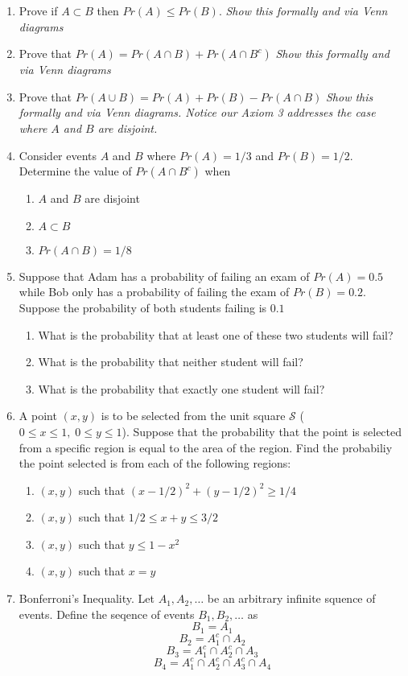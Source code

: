\documentclass[]{book}
\providecommand{\tightlist}{%
  \setlength{\itemsep}{0pt}\setlength{\parskip}{0pt}}
\begin{document}
\begin{enumerate}
\def\labelenumi{\arabic{enumi}.}
\setcounter{enumi}{4}
\item
  Prove if \(A \subset B\) then \(Pr(A) \le Pr(B)\). \emph{Show this
  formally and via Venn diagrams}
\item
  Prove that \(Pr(A) = Pr(A \cap B) + Pr( A \cap B^c)\) \emph{Show this
  formally and via Venn diagrams}
\item
  Prove that \(Pr( A \cup B) = Pr(A) + Pr(B) - Pr( A \cap B)\)
  \emph{Show this formally and via Venn diagrams. Notice our Axiom 3
  addresses the case where \(A\) and \(B\) are disjoint.}
\item
  Consider events \(A\) and \(B\) where \(Pr(A)=1/3\) and
  \(Pr(B) = 1/2\). Determine the value of \(Pr(A \cap B^c)\) when

  \begin{enumerate}
  \def\labelenumii{\alph{enumii})}
  \tightlist
  \item
    \(A\) and \(B\) are disjoint
  \item
    \(A \subset B\)
  \item
    \(Pr(A \cap B) = 1/8\)
  \end{enumerate}
\item
  Suppose that Adam has a probability of failing an exam of
  \(Pr(A) = 0.5\) while Bob only has a probability of failing the exam
  of \(Pr(B) = 0.2\). Suppose the probability of both students failing
  is \(0.1\)

  \begin{enumerate}
  \def\labelenumii{\alph{enumii})}
  \tightlist
  \item
    What is the probability that at least one of these two students will
    fail?
  \item
    What is the probability that neither student will fail?
  \item
    What is the probability that exactly one student will fail?
  \end{enumerate}
\item
  A point \((x,y)\) is to be selected from the unit square
  \(\mathcal{S}\) (\(0\le x\le 1,\; 0\le y \le 1\)). Suppose that the
  probability that the point is selected from a specific region is equal
  to the area of the region. Find the probabiliy the point selected is
  from each of the following regions:

  \begin{enumerate}
  \def\labelenumii{\alph{enumii})}
  \tightlist
  \item
    \((x,y)\) such that \((x-1/2)^2 + (y-1/2)^2 \ge 1/4\)
  \item
    \((x,y)\) such that \(1/2 \le x+y \le 3/2\)
  \item
    \((x,y)\) such that \(y \le 1-x^2\)
  \item
    \((x,y)\) such that \(x=y\)
  \end{enumerate}
\item
  Bonferroni's Inequality. Let \(A_1, A_2, \dots\) be an arbitrary
  infinite squence of events. Define the seqence of events
  \(B_1, B_2, \dots\) as \[B_1=A_1\] \[B_2 = A_1^c \cap A_2\]
  \[B_3 = A_1^c \cap A_2^c \cap A_3\]
  \[B_4 = A_1^c \cap A_2^c \cap A_3^c \cap A_4\]


\end{enumerate}
\end{document}
